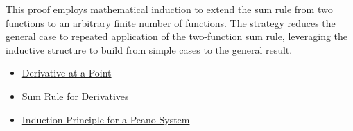 \begin{remark*}
This proof employs mathematical induction to extend the sum rule from two functions to an arbitrary finite number of functions. The strategy reduces the general case to repeated application of the two-function sum rule, leveraging the inductive structure to build from simple cases to the general result.
\end{remark*}

\begin{dependencies}
\begin{itemize}
  \item \hyperref[def:derivative-at-a-point]{Derivative at a Point}
  \item \hyperref[thm:sum-rule]{Sum Rule for Derivatives}
  \item \hyperref[thm:induction-principle-for-peano-system]{Induction Principle for a Peano System}
\end{itemize}
\end{dependencies}

\clearpage
